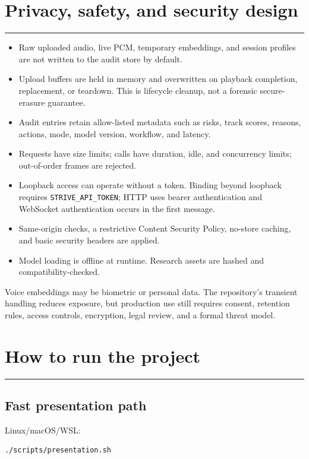 \documentclass[10pt,a4paper]{article}
\newcommand{\sectionrule}{\vspace{-2mm}\textcolor{blue}{\rule{22mm}{1.2pt}}\vspace{2mm}}
\newcommand{\code}[1]{\texttt{\small #1}}
\begin{document}
\section{Privacy, safety, and security design}
\sectionrule

\begin{itemize}
\item Raw uploaded audio, live PCM, temporary embeddings, and session profiles are not written to the audit store by default.
\item Upload buffers are held in memory and overwritten on playback completion, replacement, or teardown. This is lifecycle cleanup, not a forensic secure-erasure guarantee.
\item Audit entries retain allow-listed metadata such as risks, track scores, reasons, actions, mode, model version, workflow, and latency.
\item Requests have size limits; calls have duration, idle, and concurrency limits; out-of-order frames are rejected.
\item Loopback access can operate without a token. Binding beyond loopback requires \code{STRIVE\_API\_TOKEN}; HTTP uses bearer authentication and WebSocket authentication occurs in the first message.
\item Same-origin checks, a restrictive Content Security Policy, no-store caching, and basic security headers are applied.
\item Model loading is offline at runtime. Research assets are hashed and compatibility-checked.
\end{itemize}

Voice embeddings may be biometric or personal data. The repository's transient handling reduces exposure, but production use still requires consent, retention rules, access controls, encryption, legal review, and a formal threat model.

\section{How to run the project}
\sectionrule

\subsection{Fast presentation path}

Linux/macOS/WSL:
\begin{verbatim}
./scripts/presentation.sh
\end{verbatim}
\end{document}
